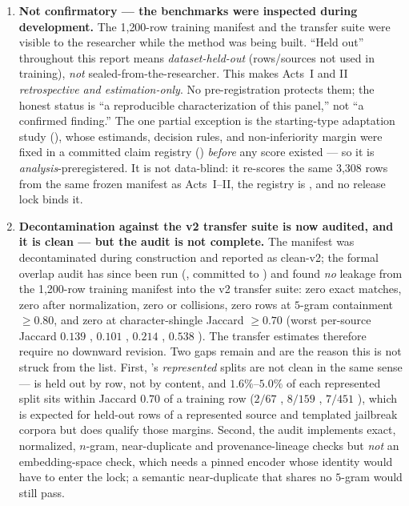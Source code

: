 \begin{enumerate}[leftmargin=1.6em,itemsep=2pt]
  \item \textbf{Not confirmatory --- the benchmarks were inspected during development.} The 1{,}200-row training manifest and the transfer suite were visible to the researcher while the method was being built. ``Held out'' throughout this report means \emph{dataset-held-out} (rows/sources not used in training), \emph{not} sealed-from-the-researcher. This makes Acts~I and II \emph{retrospective and estimation-only}. No pre-registration protects them; the honest status is ``a reproducible characterization of this panel,'' not ``a confirmed finding.'' The one partial exception is the starting-type adaptation study (), whose estimands, decision rules, and non-inferiority margin were fixed in a committed claim registry () \emph{before} any score existed --- so it is \emph{analysis}-preregistered. It is not data-blind: it re-scores the same 3{,}308 rows from the same frozen manifest as Acts~I--II, the registry is , and no release lock binds it.

  \item \textbf{Decontamination against the v2 transfer suite is now audited, and it is clean --- but the audit is not complete.}\label{sec:decontamination} The manifest was decontaminated during construction and reported as clean-v2; the formal overlap audit has since been run (, committed to ) and found \emph{no} leakage from the 1{,}200-row training manifest into the v2 transfer suite: zero exact matches, zero after normalization, zero  or  collisions, zero rows at $5$-gram containment $\geq 0.80$, and zero at character-shingle Jaccard $\geq 0.70$ (worst per-source Jaccard $0.139$ , $0.101$ , $0.214$ , $0.538$ ). The transfer estimates therefore require no downward revision. Two gaps remain and are the reason this is not struck from the list. First, 's \emph{represented} splits are not clean in the same sense ---  is held out by row, not by content, and $1.6\%$--$5.0\%$ of each represented split sits within Jaccard $0.70$ of a training row ($2/67$ , $8/159$ , $7/451$ ), which is expected for held-out rows of a represented source and templated jailbreak corpora but does qualify those margins. Second, the audit implements exact, normalized, $n$-gram, near-duplicate and provenance-lineage checks but \emph{not} an embedding-space check, which needs a pinned encoder whose identity would have to enter the lock; a semantic near-duplicate that shares no $5$-gram would still pass.


\end{enumerate}
